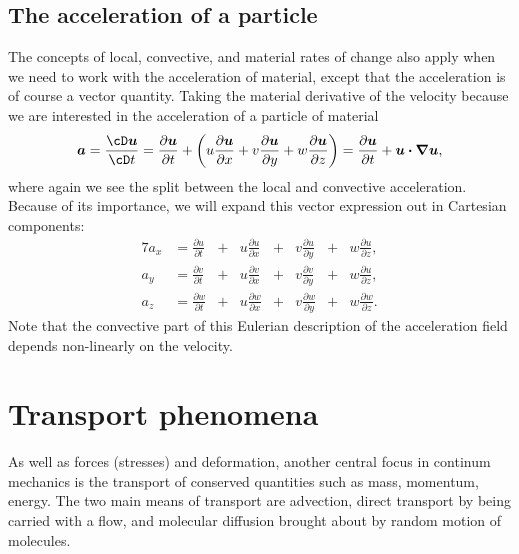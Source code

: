 \documentclass[a4paper,11pt]		{report}
\begin{document}
\subsection{The acceleration of a particle}

The concepts of local, convective, and material rates of change also
apply when we need to work with the acceleration of material, except
that the acceleration is of course a vector quantity. Taking the
material derivative of the velocity because we are interested in the
acceleration of a particle of material
\[
\bm{a}=\frac{\cD\bm{u}}{\cD t}=
  \frac{\partial\bm{u}}{\partial t}+
  \left(u\frac{\partial\bm{u}}{\partial x}+
        v\frac{\partial\bm{u}}{\partial y}+
        w\frac{\partial\bm{u}}{\partial z}\right)=
  \frac{\partial\bm{u}}{\partial t}+\bm{u\cdot\nabla u}
,
\]
where again we see the split between the local and convective
acceleration.  Because of its importance, we will expand this vector
expression out in Cartesian components:
\begin{alignat*}{7}
a_x&=\frac{\partial u}{\partial t}&+&
    u\frac{\partial u}{\partial x}&+&
    v\frac{\partial u}{\partial y}&+&
    w\frac{\partial u}{\partial z},\\
a_y&=\frac{\partial v}{\partial t}&+&
    u\frac{\partial v}{\partial x}&+&
    v\frac{\partial v}{\partial y}&+&
    w\frac{\partial u}{\partial z},\\
a_z&=\frac{\partial w}{\partial t}&+&
    u\frac{\partial w}{\partial x}&+&
    v\frac{\partial w}{\partial y}&+&
    w\frac{\partial w}{\partial z}.
\end{alignat*}
Note that the convective part of this Eulerian description of the
acceleration field depends non-linearly on the velocity.

\section{Transport phenomena}

As well as forces (stresses) and deformation, another central focus in
continum mechanics is the transport of conserved quantities such as
mass, momentum, energy. The two main means of transport are advection,
\ie direct transport by being carried with a flow, and molecular
diffusion brought about by random motion of molecules.

\end{document}
